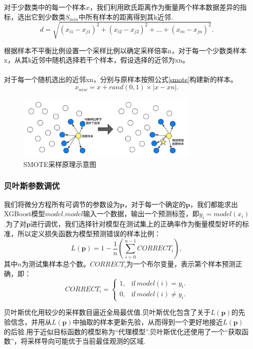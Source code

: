 \documentclass{whutmod}
\newcommand{\upcite}[1]{\textsuperscript{\textsuperscript{\cite{#1}}}}
\begin{document}
对于少数类中的每一个样本$x$，我们利用欧氏距离作为衡量两个样本数据差异的指标，选出它到少数类$S_{min}$中所有样本的距离得到其k近邻.
\begin{equation}
d=\sqrt{(x_{i1}-x_{j1})^2+(x_{i2}-x_{j2})^2+...+(x_{in}-x_{jn})^2}.
\end{equation}


根据样本不平衡比例设置一个采样比例以确定采样倍率n，对于每一个少数类样本x，从其k近邻中随机选择若干个样本，假设选择的近邻为xn。

对于每一个随机选出的近邻xn，分别与原样本按照公式\ref{smote}构建新的样本\upcite{bib:seven}。
\begin{equation}
x_{new}=x+rand(0,1)\times|x-xn|.
\label{smote}
\end{equation}

\begin{figure}[!h]
	\centering
	\includegraphics[width=0.8\textwidth]{caiyang.png}
	\caption{SMOTE采样原理示意图}
\end{figure}


\subsubsection{贝叶斯参数调优}
我们将微分方程所有可调节的参数设为$\mathbf{p}$，对于每一个确定的$\mathbf{p}$，我们都能求出XGBoost模型$model$.$model$输入一个数据，输出一个预测标签，即$y_i = model(x_i)$.为了对$\mathbf{p}$进行调优，我们选择针对模型在测试集上的正确率作为衡量模型好坏的标准，所以定义损失函数为模型预测错误的样本比例：
\begin{equation}
L(\mathbf{p})=1-\frac{1}{n}(\sum_{i=0}^{n-1} CORRECT_i),
\end{equation}
其中$n$为测试集样本总个数。$CORRECT_i$为一个布尔变量，表示第个样本预测正确，即：
\begin{equation}
CORRECT_i = 
\begin{cases}
1, &\text{if}\ model(i)=y_i. \\
0, & \text{if}\ model(i)\neq y_i.
\end{cases}
\end{equation}

贝叶斯优化用较少的采样数目逼近全局最优值.贝叶斯优化包含了关于$L(\mathbf{p})$的先验信念，并用从$L(\mathbf{p})$中抽取的样本更新先验，从而得到一个更好地接近$L(\mathbf{p})$的后验.用于近似目标函数的模型称为“代理模型”.贝叶斯优化还使用了一个“获取函数”，将采样导向可能优于当前最佳观测的区域.
\end{document}
